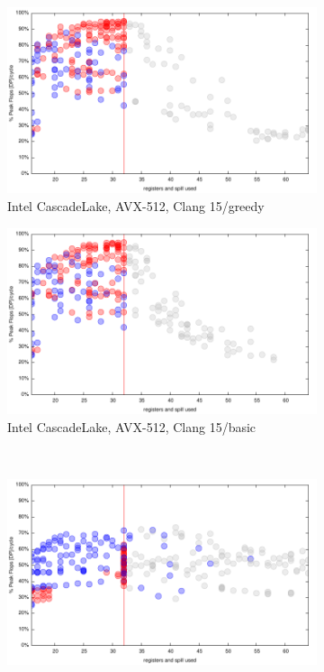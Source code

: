 \documentclass{article}
\begin{document}
\begin{figure}[h!]
  \begin{subfigure}[h!]{0.45\textwidth}  
\includegraphics[width=\textwidth]{../benches/gemm/cascadelake-64x256x64/greedy.pdf}
  \caption{Intel CascadeLake, AVX-512, Clang 15/greedy}
  \end{subfigure}
  \begin{subfigure}[h!]{0.45\textwidth}  
\includegraphics[width=\textwidth]{../benches/gemm/cascadelake-64x256x64/basic.pdf}
  \caption{Intel CascadeLake, AVX-512, Clang 15/basic}
  \end{subfigure}\\
  \begin{subfigure}[h!]{0.45\textwidth}  
\includegraphics[width=\textwidth]{../benches/gemm/cascadelake-64x256x64/gcc-11.9.pdf}

\end{subfigure}
\end{figure}
\end{document}

